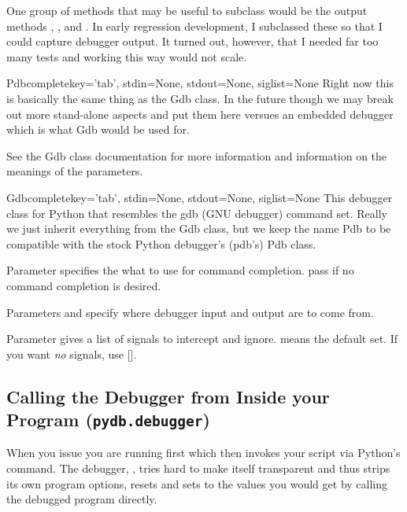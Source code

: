 One group of methods that may be useful to subclass would be the
output methods , , and
. In early regression development, I subclassed these
so that I could capture debugger output. It turned out, however, that
I needed far too many tests and working this way would not scale.

\begin{classdesc}{Pdb}{completekey='tab', stdin=None, stdout=None,
                  siglist=None}\label{Pdb}
Right now this is basically the same thing as the Gdb class. In the
future though we may break out more stand-alone aspects and put them here
versues an embedded debugger which is what Gdb would be used for.

See the Gdb class documentation for more information and information on
the meanings of the parameters.
\end{classdesc}

\begin{classdesc}{Gdb}{completekey='tab', stdin=None, stdout=None,
                  siglist=None}\label{Gdb}
This debugger class for Python that resembles the gdb (GNU debugger)
command set. Really we just inherit everything from the Gdb class,
but we keep the name Pdb to be compatible with the stock Python
debugger's (pdb's) Pdb class.

Parameter  specifies the what to use for command completion.
pass  if no command completion is desired.

Parameters  and  specify where debugger input
and output are to come from.
    
Parameter  gives a list of signals to intercept and
ignore.  means the default set. If you want \emph{no}
signals, use [].
\end{classdesc}

\subsection{Calling the Debugger from Inside your Program ({\tt pydb.debugger})}\label{subsection-calling-pydb-inside-program}

When you issue  you are running 
first which then invokes your script  via Python's
 command. The debugger, , tries hard to make
itself transparent and thus strips its own program options, resets
 and sets  to the values you would get
by calling the debugged program directly.

